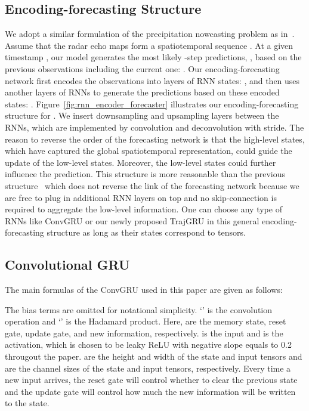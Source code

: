 \documentclass{article}
\begin{document}
\subsection{Encoding-forecasting Structure}
We adopt a similar formulation of the precipitation nowcasting problem as in~\cite{xingjian2015convolutional}. Assume that the radar echo maps form a spatiotemporal sequence .
At a given timestamp , our model generates the most likely -step predictions, , based on the previous  observations including the current one: . Our encoding-forecasting network first encodes the observations into  layers of RNN states: , and then uses another  layers of RNNs to generate the predictions based on these encoded states: . Figure~\ref{fig:rnn_encoder_forecaster} illustrates our encoding-forecasting structure for . We insert downsampling and upsampling layers between the RNNs, which are implemented by convolution and deconvolution with stride. The reason to reverse the order of the forecasting network is that the high-level states, which have captured the global spatiotemporal representation, could guide the update of the low-level states. Moreover, the low-level states could further influence the prediction. This structure is more reasonable than the previous structure~\cite{xingjian2015convolutional} which does not reverse the link of the forecasting network because we are free to plug in additional RNN layers on top and no skip-connection is required to aggregate the low-level information. One can choose any type of RNNs like ConvGRU or our newly proposed TrajGRU in this general encoding-forecasting structure as long as their states correspond to tensors.

\subsection{Convolutional GRU}
The main formulas of the ConvGRU used in this paper are given as follows:

The bias terms are omitted for notational simplicity. `' is the convolution operation and `' is the Hadamard product. Here,  are the memory state, reset gate, update gate, and new information, respectively.  is the input and  is the activation, which is chosen to be leaky ReLU with negative slope equals to 0.2~\cite{maas2013rectifier} througout the paper.  are the height and width of the state and input tensors and  are the channel sizes of the state and input tensors, respectively. Every time a new input arrives, the reset gate will control whether to clear the previous state and the update gate will control how much the new information will be written to the state.
\end{document}
